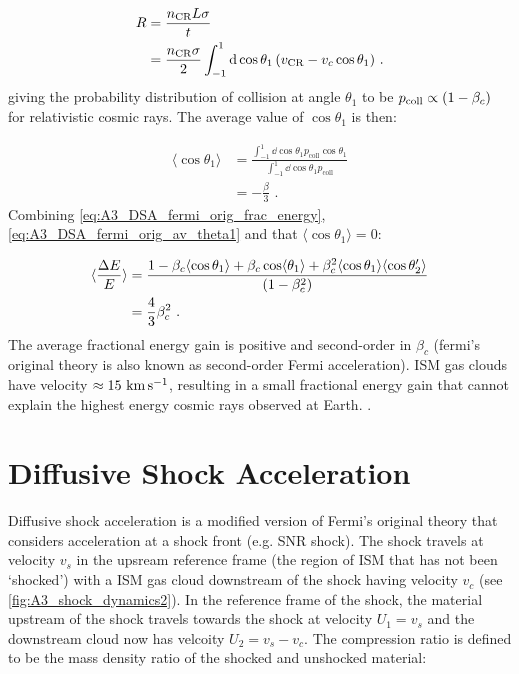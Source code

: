 \begin{equation}
    \begin{aligned}
        R&=\frac{n_\text{CR}L\sigma}{t} \\
        &=\frac{n_\text{CR}\sigma}{2}\int_{-1}^1\dd{\cos\theta_1}\qty(v_\text{CR}-v_c\cos\theta_1) \text{ .}
    \end{aligned}
\end{equation}
\noindent giving the probability distribution of collision at angle $\theta_1$ to be $p_\text{coll}\propto \qty(1-\beta_c)$ for relativistic cosmic rays. The average value of $\cos\theta_1$ is then:

\begin{equation}
    \begin{aligned}
        \langle \cos\theta_1\rangle &=\frac{\int_{-1}^1\dd{\cos\theta_1}p_\text{coll}\cos\theta_1}{\int_{-1}^1\dd{\cos\theta_1}p_\text{coll}} \\
        &=-\frac{\beta}{3} \text{ .}
    \end{aligned} \label{eq:A3_DSA_fermi_orig_av_theta1}
\end{equation} 
\noindent Combining \autoref{eq:A3_DSA_fermi_orig_frac_energy}, \autoref{eq:A3_DSA_fermi_orig_av_theta1} and that $\langle \cos\theta_1 \rangle=0$:

\begin{equation}
    \begin{aligned}
        \langle \frac{\Delta E}{E} \rangle&=\frac{1-\beta_c\langle\cos\theta_1\rangle+\beta_c\cos\langle\theta_1\rangle+\beta_c^2\langle\cos\theta_1\rangle\langle\cos\theta_2'\rangle}{\qty(1-\beta_c^2)} \\
        &= \frac{4}{3}\beta_c^2 \text{ .}
    \end{aligned}
\end{equation}
\noindent The average fractional energy gain is positive and second-order in $\beta_c$ (fermi's original theory is also known as second-order Fermi acceleration). ISM gas clouds have velocity $\approx 15~\si{\kilo\meter\per\second}$, resulting in a small fractional energy gain that cannot explain the highest energy cosmic rays observed at Earth. \citep{1949PhRv...75.1169F}. 

\section{Diffusive Shock Acceleration}

Diffusive shock acceleration is a modified version of Fermi's original theory that considers acceleration at a shock front (e.g. SNR shock). The shock travels at velocity $v_s$ in the upsream reference frame (the region of ISM that has not been `shocked') with a ISM gas cloud downstream of the shock having velocity $v_c$ (see \autoref{fig:A3_shock_dynamics2}). In the reference frame of the shock, the material upstream of the shock travels towards the shock at velocity $U_1=v_s$ and the downstream cloud now has velcoity $U_2=v_s-v_c$. The compression ratio is defined to be the mass density ratio of the shocked and unshocked material:

